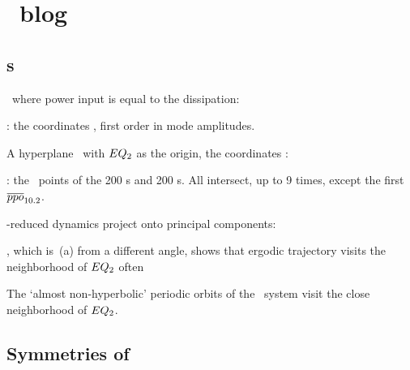 
\chapter{\PoincSec\ blog}
\label{c-PoincSecBlog}


\section{\PoincSec s}
\label{sec:PoincSecs}

\PoincSec\
where power input is equal to the dissipation:

:
the coordinates
, first order in mode amplitudes.

A hyperplane \PoincSec\ with $EQ_{2}$ as the origin, the coordinates
\refeq{e-xRefs3}:

:
the \PoincSec\ points of the 200 \rpo s and 200 \ppo s. All intersect, up
to 9 times,
except the first \ppo\ $\overline{ppo}_{10.2}$.

-reduced dynamics project onto principal components:

, which is \,(a) from a different angle,
shows that ergodic trajectory visits the neighborhood of $EQ_{2}$ often

The `almost non-hyperbolic' periodic orbits of the \KS\ system visit the
close neighborhood of $EQ_{2}$.

\section{Symmetries of \KSe}
\label{sec:KSeSymm}


\bigskip

